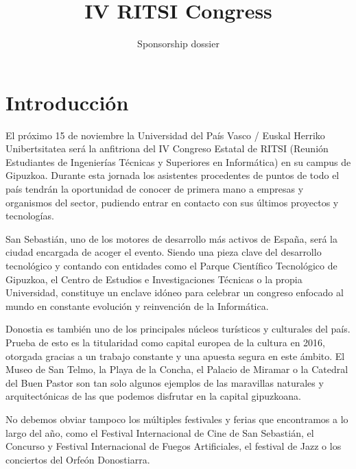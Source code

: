 \documentclass[11pt]{ritsi/article}
\title{IV RITSI Congress}
\author{Sponsorship dossier}
\begin{document}
\maketitle

\tableofcontents

\cleardoublepage

\section{Introducción}

El próximo 15 de noviembre la Universidad del País Vasco / Euskal Herriko Unibertsitatea será la anfitriona del IV Congreso Estatal de RITSI (Reunión Estudiantes de Ingenierías Técnicas y Superiores en Informática) en su campus de Gipuzkoa. Durante esta jornada los asistentes procedentes de puntos de todo el país tendrán la oportunidad de conocer de primera mano a empresas y organismos del sector, pudiendo entrar en contacto con sus últimos proyectos y tecnologías.

San Sebastián, uno de los motores de desarrollo más activos de España, será la ciudad encargada de acoger el evento. Siendo una pieza clave del desarrollo tecnológico y contando con entidades como el Parque Científico Tecnológico de Gipuzkoa, el Centro de Estudios e Investigaciones Técnicas o la propia Universidad, constituye un enclave idóneo para celebrar un congreso enfocado al mundo en constante evolución y reinvención de la Informática.

Donostia es también uno de los principales núcleos turísticos y culturales del país. Prueba de esto es la titularidad como capital europea de la cultura en 2016, otorgada gracias a un trabajo constante y una apuesta segura en este ámbito. El Museo de San Telmo, la Playa de la Concha, el Palacio de Miramar o la Catedral del Buen Pastor son tan solo algunos ejemplos de las maravillas naturales y arquitectónicas de las que podemos disfrutar en la capital gipuzkoana.

No debemos obviar tampoco los múltiples festivales y ferias que encontramos a lo largo del año, como el Festival Internacional de Cine de San Sebastián, el Concurso y Festival Internacional de Fuegos Artificiales, el festival de Jazz o los conciertos del Orfeón Donostiarra.
 
\end{document}
